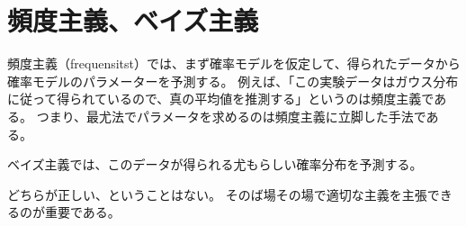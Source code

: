 \documentclass[a4j,twocolumn, uplatex]{jsarticle}
\begin{document}
\section{頻度主義、ベイズ主義}

頻度主義（frequensitst）では、まず確率モデルを仮定して、得られたデータから確率モデルのパラメーターを予測する。
例えば、「この実験データはガウス分布に従って得られているので、真の平均値を推測する」というのは頻度主義である。
つまり、最尤法でパラメータを求めるのは頻度主義に立脚した手法である。

ベイズ主義では、このデータが得られる尤もらしい確率分布を予測する。

どちらが正しい、ということはない。
そのば場その場で適切な主義を主張できるのが重要である。
\end{document}
